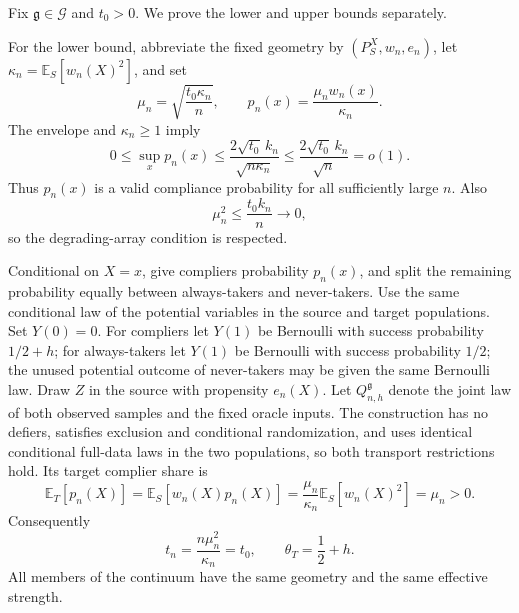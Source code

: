 Fix \(\mathfrak g\in\mathcal G\) and \(t_0>0\).  We prove the lower and upper bounds separately.

For the lower bound, abbreviate the fixed geometry by \((P_S^X,w_n,e_n)\), let \(\kappa_n=\mathbb E_S[w_n(X)^2]\), and set
\[
 \mu_n=\sqrt{\frac{t_0\kappa_n}{n}},
 \qquad p_n(x)=\frac{\mu_nw_n(x)}{\kappa_n}.
\]
The envelope and \(\kappa_n\ge1\) imply
\[
 0\le\sup_xp_n(x)\le
 \frac{2\sqrt{t_0}\,k_n}{\sqrt{n\kappa_n}}
 \le\frac{2\sqrt{t_0}\,k_n}{\sqrt n}=o(1).
\]
Thus \(p_n(x)\) is a valid compliance probability for all sufficiently large \(n\).  Also
\[
 \mu_n^2\le\frac{t_0k_n}{n}\longrightarrow0,
\]
so the degrading-array condition is respected.

Conditional on \(X=x\), give compliers probability \(p_n(x)\), and split the remaining probability equally between always-takers and never-takers.  Use the same conditional law of the potential variables in the source and target populations.  Set \(Y(0)=0\).  For compliers let \(Y(1)\) be Bernoulli with success probability \(1/2+h\); for always-takers let \(Y(1)\) be Bernoulli with success probability \(1/2\); the unused potential outcome of never-takers may be given the same Bernoulli law.  Draw \(Z\) in the source with propensity \(e_n(X)\).  Let \(Q_{n,h}^{\mathfrak g}\) denote the joint law of both observed samples and the fixed oracle inputs.  The construction has no defiers, satisfies exclusion and conditional randomization, and uses identical conditional full-data laws in the two populations, so both transport restrictions hold.  Its target complier share is
\[
 \mathbb E_T[p_n(X)]
 =\mathbb E_S[w_n(X)p_n(X)]
 =\frac{\mu_n}{\kappa_n}\mathbb E_S[w_n(X)^2]
 =\mu_n>0.
\]
Consequently
\[
 t_n=\frac{n\mu_n^2}{\kappa_n}=t_0,
 \qquad \theta_T=\frac12+h.
\]
All members of the continuum have the same geometry and the same effective strength.

